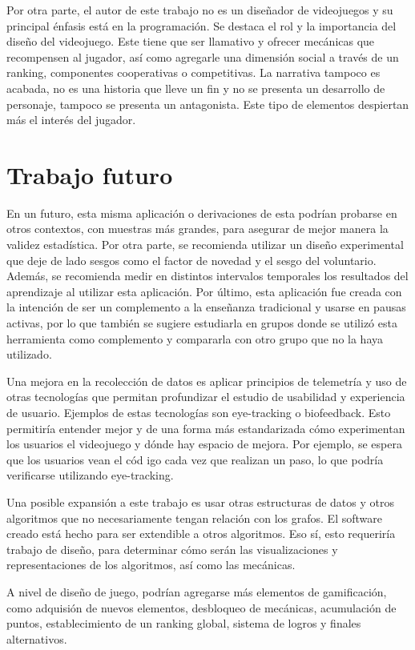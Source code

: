 Por otra parte, el autor de este trabajo no es un diseñador de videojuegos y su principal énfasis está en la programación. Se destaca el rol y la importancia del diseño del videojuego. Este tiene que ser llamativo y ofrecer mecánicas que recompensen al jugador, así como agregarle una dimensión social a través de un ranking, componentes cooperativas o competitivas. La narrativa tampoco es acabada, no es una historia que lleve un fin y no se presenta un desarrollo de personaje, tampoco se presenta un antagonista. Este tipo de elementos despiertan más el interés del jugador.

\section{Trabajo futuro}


En un futuro, esta misma aplicación o derivaciones de esta podrían probarse en otros contextos, con muestras más grandes, para asegurar de mejor manera la validez estadística. Por otra parte, se recomienda utilizar un diseño experimental que deje de lado sesgos como el factor de novedad y el sesgo del voluntario. Además, se recomienda medir en distintos intervalos temporales los resultados del aprendizaje al utilizar esta aplicación. Por último, esta aplicación fue creada con la intención de ser un complemento a la enseñanza tradicional y usarse en pausas activas, por lo que también se sugiere estudiarla en grupos donde se utilizó esta herramienta como complemento y compararla con otro grupo que no la haya utilizado.

Una mejora en la recolección de datos es aplicar principios de telemetría y uso de otras tecnologías que permitan profundizar el estudio de usabilidad y experiencia de usuario. Ejemplos de estas tecnologías son eye-tracking o biofeedback. Esto permitiría entender mejor y de una forma más estandarizada cómo experimentan los usuarios el videojuego y dónde hay espacio de mejora. Por ejemplo, se espera que los usuarios vean el cód igo cada vez que realizan un paso, lo que podría verificarse utilizando eye-tracking. 

Una posible expansión a este trabajo es usar otras estructuras de datos y otros algoritmos que no necesariamente tengan relación con los grafos. El software creado está hecho para ser extendible a otros algoritmos. Eso sí, esto requeriría trabajo de diseño, para determinar cómo serán las visualizaciones y representaciones de los algoritmos, así como las mecánicas.

A nivel de diseño de juego, podrían agregarse más elementos de gamificación, como adquisión de nuevos elementos, desbloqueo de mecánicas, acumulación de puntos, establecimiento de un ranking global, sistema de logros y finales alternativos.

